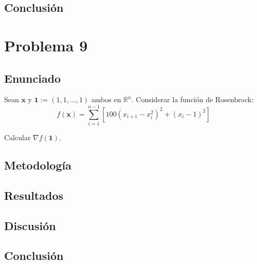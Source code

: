 \documentclass{article}
\begin{document}
\subsection{Conclusión}

\section{Problema 9}

\subsection{Enunciado}
Sean $\mathbf{x}$ y $\mathbf{1} := (1, 1, \ldots, 1)$ ambos en $\mathbb{R}^n$. Considerar la función de Rosenbrock:
$$f(\mathbf{x}) = \sum_{i=1}^{n-1} \left[100(x_{i+1} - x_i^2)^2 + (x_i - 1)^2\right]$$

Calcular $\nabla f(\mathbf{1})$.

\subsection{Metodología}

\subsection{Resultados}
\setcounter{equation}{0}

\subsection{Discusión}

\subsection{Conclusión}
\end{document}
